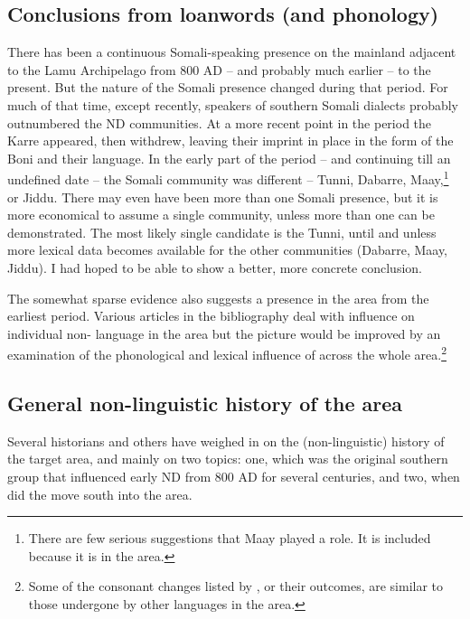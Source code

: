 \documentclass[output=paper,newtxmath,modfonts,nonflat,hidelinks]{langsci/langscibook}
\begin{document}
\subsection{Conclusions from loanwords (and phonology)}\label{sec:nurse:5.5} There has been a continuous Somali-speaking presence on the mainland adjacent to the Lamu Archipelago from 800 AD – and probably much earlier – to the present. But the nature of the Somali presence changed during that period. For much of that time, except recently, speakers of southern Somali dialects probably outnumbered the ND communities. At a more recent point in the period the Karre appeared, then withdrew, leaving their imprint in place in the form of the Boni and their language. In the early part of the period – and continuing till an undefined date -- the Somali community was different – Tunni, Dabarre, Maay,\footnote{There are few serious suggestions that Maay played a role. It is included because it is in the area.}  or Jiddu. There may even have been more than one Somali presence, but it is more economical to assume a single community, unless more than one can be demonstrated. The most likely single candidate is the Tunni, until and unless more lexical data becomes available for the other communities (Dabarre, Maay, Jiddu). I had hoped to be able to show a better, more concrete conclusion.

The somewhat sparse evidence also suggests a  presence in the area from the earliest period. Various articles in the bibliography deal with  influence on individual non- language in the area but the picture would be improved by an examination of the phonological and lexical influence of  across the whole area.\footnote{Some of the consonant changes listed by \citet[115-26]{Ehret1980}, or their outcomes, are similar to those undergone by other languages in the area.}  

\subsection{General non-linguistic history of the area} Several historians and others have weighed in on the (non-linguistic) history of the target area, and mainly on two topics: one, which was the original southern  group that influenced early ND from 800 AD for several centuries, and two, when did the  move south into the area.
\end{document}
